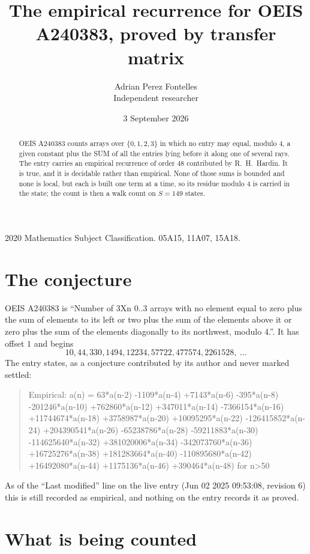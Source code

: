 \documentclass[11pt,a4paper]{article}
\title{The empirical recurrence for OEIS A240383, proved by transfer matrix}
\author{Adrian Perez Fontelles\\ \small Independent researcher}
\date{3 September 2026}
\theoremstyle{plain}
\theoremstyle{definition}
\begin{document}
\maketitle

\begin{abstract}
OEIS A240383 counts arrays over $\{0,1,2,3\}$ in which no entry may equal, modulo $4$, a given
constant plus the SUM of all the entries lying before it along one of several rays. The entry
carries an empirical recurrence of order $48$ contributed by R.~H.~Hardin. It is true, and
it is decidable rather than empirical. None of those sums is bounded and none is local, but
each is built one term at a time, so its residue modulo $4$ is carried in the state; the
count is then a walk count on $S=149$ states.
\end{abstract}

\noindent\small 2020 Mathematics Subject Classification. 05A15, 11A07, 15A18.\normalsize

\section{The conjecture}

OEIS A240383 is ``Number of 3Xn 0..3 arrays with no element equal to zero plus the sum of elements to its left or two plus the sum of the elements above it or zero plus the sum of the elements diagonally to its northwest, modulo 4.''. It has offset $1$ and begins
\[
10, 44, 330, 1494, 12234, 57722, 477574, 2261528,\ \dots
\]
The entry states, as a conjecture contributed by its author and never marked settled:
\begin{quote}
Empirical: a(n) = 63*a(n-2) -1109*a(n-4) +7143*a(n-6) -395*a(n-8) -201246*a(n-10) +762860*a(n-12) +347011*a(n-14) -7366154*a(n-16) +11744674*a(n-18) +3758987*a(n-20) +10095295*a(n-22) -126415852*a(n-24) +204390541*a(n-26) -65238786*a(n-28) -59211883*a(n-30) -114625640*a(n-32) +381020006*a(n-34) -342073760*a(n-36) +16725276*a(n-38) +181283664*a(n-40) -110895680*a(n-42) +16492080*a(n-44) +1175136*a(n-46) +390464*a(n-48) for n>50
\end{quote}
As of the ``Last modified'' line on the live entry (Jun 02 2025 09:53:08, revision 6) this is still
recorded as empirical, and nothing on the entry records it as proved.

\section{What is being counted}
\end{document}
